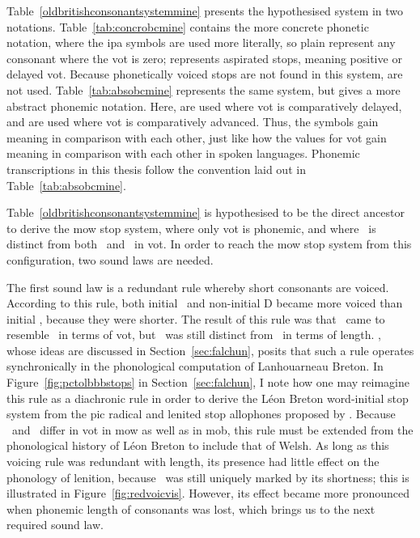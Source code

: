 Table~\ref{oldbritishconsonantsystemmine} presents the hypothesised system in two notations. Table~\ref{tab:concrobcmine} contains the more concrete phonetic notation, where the \gls{ipa} symbols are used more literally, so plain  represent any consonant where the \gls{vot} is zero;  represents aspirated stops, meaning positive or delayed \gls{vot}. Because  phonetically voiced stops are not found in this system,  are not used. Table~\ref{tab:absobcmine}  represents the same system, but gives a more abstract phonemic notation. Here,  are used where \gls{vot} is comparatively delayed, and  are used where \gls{vot} is comparatively advanced. Thus, the symbols gain meaning in comparison with each other, just like how the values for \gls{vot} gain meaning in comparison with each other in spoken languages. Phonemic transcriptions in this thesis follow the convention laid out in Table~\ref{tab:absobcmine}.

Table~\ref{oldbritishconsonantsystemmine} is hypothesised to be the direct ancestor to derive the \gls{mow} stop system, where only \gls{vot} is phonemic, and where \xT\ is distinct from both \lT\ and \xD\ in \gls{vot}. In order to reach the \gls{mow} stop system from this configuration, two sound laws are needed.

The first sound law is a redundant rule whereby short consonants are voiced. According to this rule, both initial \lT\ and non-initial \gls{D} became more voiced than initial \xT, because they were shorter. The result of this rule was that \lT\ came to resemble \xD\ in terms of \gls{vot}, but \lT\ was still distinct from \xD\ in terms of length. \Textcite{carlyle_syllabic_1988}, whose ideas are discussed in Section~\ref{sec:falchun}, posits that such a rule operates synchronically in the phonological computation of Lanhouarneau Breton. In Figure~\ref{fig:pctolbbbstops} in Section~\ref{sec:falchun}, I note how one may reimagine this rule as a diachronic rule in order to derive the Léon Breton word-initial stop system from the \gls{pic} radical and lenited stop allophones proposed by \textcite{harvey_aspects_1984}. Because \xT\ and \lT\ differ in \gls{vot} in \gls{mow} as well as in \gls{mob}, this rule must be extended from  the phonological history of Léon Breton to include that of Welsh. As long as this voicing rule was redundant with length, its presence had little effect on the phonology of lenition, because \lT\ was still uniquely marked by its shortness; this is illustrated in Figure~\ref{fig:redvoicvis}. However, its effect became more pronounced when phonemic length of consonants was lost, which brings us to the next required sound law.

